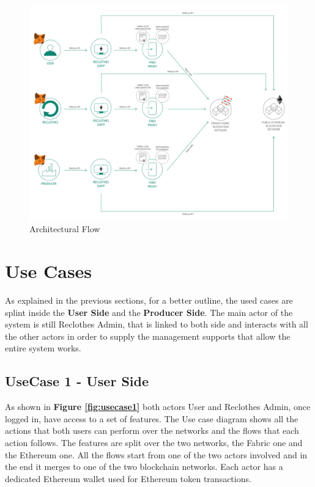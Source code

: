 \begin{figure}[h]
	\centering
	\includegraphics[totalheight=14cm]{img/architectural_flow.png}
	\caption{Architectural Flow}
    \label{fig:architectural-flow}
\end{figure}
 

\clearpage
\section{Use Cases}
\label{use-cases}

As explained in the previous sections, for a better outline, the used cases are splint inside the 
\textbf{User Side} and the \textbf{Producer Side}. The main actor of the system is still Reclothes Admin, 
that is linked to both side and interacts with all the other actors in order to supply the management 
supports that allow the entire system works.

\subsection{UseCase 1 - User Side}

As shown in \textbf{Figure \ref{fig:usecase1}} both actors User and Reclothes Admin, once logged in, have access to a set
of features. The Use case diagram shows all the actions that both users can perform over the networks and
the flows that each action follows. The features are split over the two networks, the Fabric one and the 
Ethereum one. All the flows start from one of the two actors involved and in the end it merges to one 
of the two blockchain networks. Each actor has a dedicated Ethereum wallet used for Ethereum token
transactions. 
\bigskip

